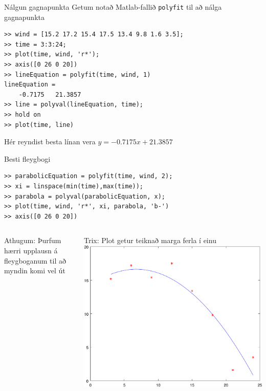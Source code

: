 \documentclass{beamer}
\begin{document}
\begin{frame}[fragile]{Nálgun gagnapunkta}
    Getum notað Matlab-fallið \texttt{polyfit} til að nálga gagnapunkta
    \begin{verbatim}
>> wind = [15.2 17.2 15.4 17.5 13.4 9.8 1.6 3.5];
>> time = 3:3:24;
>> plot(time, wind, 'r*');
>> axis([0 26 0 20])
>> lineEquation = polyfit(time, wind, 1)
lineEquation =
    -0.7175   21.3857
>> line = polyval(lineEquation, time);
>> hold on
>> plot(time, line)
    \end{verbatim}
    Hér reyndist besta línan vera $y = -0.7175x + 21.3857$
\end{frame}

\begin{frame}[fragile]{Besti fleygbogi}
    \begin{verbatim}
>> parabolicEquation = polyfit(time, wind, 2);
>> xi = linspace(min(time),max(time));
>> parabola = polyval(parabolicEquation, x);
>> plot(time, wind, 'r*', xi, parabola, 'b-')
>> axis([0 26 0 20])
    \end{verbatim}
    \begin{columns}
    \small
    Athugum: Þurfum hærri upplausn á fleygboganum til að myndin komi vel út
    
    Trix: Plot getur teiknað marga ferla í einu
    \includegraphics[width=\linewidth]{../T1a/Pics/wind-parabola}
    \end{columns}
\end{frame}
\end{document}
